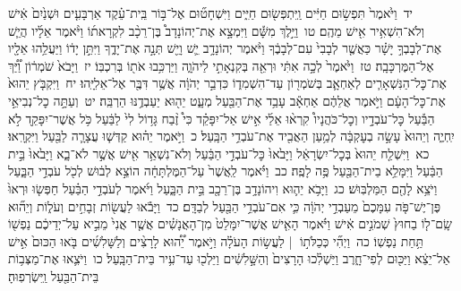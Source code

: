 \documentclass[18pt]{article}
\newcommand{\vart}[1]{\Bfootnote{#1}}	%
\begin{document}
 {\loc יד~}וַיֹּ֙אמֶר֙ תִּפְשׂ֣וּם חַיִּ֔ים וַֽיִּתְפְּשׂ֖וּם חַיִּ֑ים וַיִּשְׁחָט֞וּם אֶל־בּ֣וֹר בֵּֽית־עֵ֗קֶד אַרְבָּעִ֤ים וּשְׁנַ֙יִם֙ אִ֔ישׁ וְלֹא־הִשְׁאִ֥יר אִ֖ישׁ מֵהֶֽם׃ \startlock
 {\loc טו~}וַיֵּ֣לֶךְ מִשָּׁ֡ם וַיִּמְצָ֣א אֶת־יְהוֹנָדָב֩ בֶּן־רֵכָ֨ב לִקְרָאת֜וֹ  \edtext{וַֽיְבָרְכֵ֗הוּ}{\vart{א=וַֽיְבָרֲכֵ֗הוּ (חטף) | }}  וַיֹּ֨אמֶר אֵלָ֜יו הֲיֵ֧שׁ אֶת־לְבָבְךָ֣ יָשָׁ֗ר כַּאֲשֶׁ֤ר לְבָבִי֙ עִם־לְבָבֶ֔ךָ וַיֹּ֨אמֶר יְהוֹנָדָ֥ב יֵ֛שׁ וָיֵ֖שׁ תְּנָ֣ה אֶת־יָדֶ֑ךָ וַיִּתֵּ֣ן יָד֔וֹ וַיַּעֲלֵ֥הוּ אֵלָ֖יו אֶל־הַמֶּרְכָּבָֽה׃ \startlock
 {\loc טז~}וַיֹּ֙אמֶר֙ לְכָ֣ה אִתִּ֔י וּרְאֵ֖ה בְּקִנְאָתִ֣י לַיהֹוָ֑ה וַיַּרְכִּ֥בוּ אֹת֖וֹ בְּרִכְבּֽוֹ׃ \startlock
 {\loc יז~}וַיָּבֹא֙ שֹׁמְר֔וֹן וַ֠יַּ֠ךְ אֶת־כׇּל־הַנִּשְׁאָרִ֧ים לְאַחְאָ֛ב בְּשֹׁמְר֖וֹן עַד־הִשְׁמִד֑וֹ כִּדְבַ֣ר יְהֹוָ֔ה אֲשֶׁ֥ר דִּבֶּ֖ר אֶל־אֵלִיָּֽהוּ׃ \startlock
 {\loc יח~}וַיִּקְבֹּ֤ץ יֵהוּא֙ אֶת־כׇּל־הָעָ֔ם וַיֹּ֣אמֶר אֲלֵהֶ֔ם אַחְאָ֕ב עָבַ֥ד אֶת־הַבַּ֖עַל מְעָ֑ט יֵה֖וּא יַעַבְדֶ֥נּוּ הַרְבֵּֽה׃ \startlock
 {\loc יט~}וְעַתָּ֣ה כׇל־נְבִיאֵ֣י הַבַּ֡עַל כׇּל־עֹבְדָ֣יו וְכׇל־כֹּהֲנָיו֩ קִרְא֨וּ אֵלַ֜י אִ֣ישׁ אַל־יִפָּקֵ֗ד כִּי֩ זֶ֨בַח גָּד֥וֹל לִי֙ לַבַּ֔עַל כֹּ֥ל אֲשֶׁר־יִפָּקֵ֖ד לֹ֣א יִֽחְיֶ֑ה וְיֵהוּא֙ עָשָׂ֣ה בְעׇקְבָּ֔ה לְמַ֥עַן הַאֲבִ֖יד אֶת־עֹבְדֵ֥י הַבָּֽעַל׃ \startlock
 {\loc כ~}וַיֹּ֣אמֶר יֵה֗וּא קַדְּשׁ֧וּ עֲצָרָ֛ה לַבַּ֖עַל וַיִּקְרָֽאוּ׃ \startlock
 {\loc כא~}וַיִּשְׁלַ֤ח יֵהוּא֙ בְּכׇל־יִשְׂרָאֵ֔ל וַיָּבֹ֙אוּ֙ כׇּל־עֹבְדֵ֣י הַבַּ֔עַל וְלֹא־נִשְׁאַ֥ר אִ֖ישׁ אֲשֶׁ֣ר לֹא־בָ֑א וַיָּבֹ֙אוּ֙ בֵּ֣ית הַבַּ֔עַל וַיִּמָּלֵ֥א בֵית־הַבַּ֖עַל פֶּ֥ה לָפֶֽה׃ \startlock
 {\loc כב~}וַיֹּ֗אמֶר לַֽאֲשֶׁר֙ עַל־הַמֶּלְתָּחָ֔ה הוֹצֵ֣א לְב֔וּשׁ לְכֹ֖ל עֹבְדֵ֣י הַבָּ֑עַל וַיֹּצֵ֥א לָהֶ֖ם הַמַּלְבּֽוּשׁ׃ \startlock
 {\loc כג~}וַיָּבֹ֥א יֵה֛וּא וִיהוֹנָדָ֥ב בֶּן־רֵכָ֖ב בֵּ֣ית הַבָּ֑עַל וַיֹּ֜אמֶר לְעֹבְדֵ֣י הַבַּ֗עַל חַפְּשׂ֤וּ וּרְאוּ֙ פֶּן־יֶשׁ־פֹּ֤ה עִמָּכֶם֙ מֵעַבְדֵ֣י יְהֹוָ֔ה כִּ֛י אִם־עֹבְדֵ֥י הַבַּ֖עַל לְבַדָּֽם׃ \startlock
 {\loc כד~}וַיָּבֹ֕אוּ לַעֲשׂ֖וֹת זְבָחִ֣ים וְעֹל֑וֹת וְיֵה֞וּא שָֽׂם־ל֤וֹ בַחוּץ֙ שְׁמֹנִ֣ים אִ֔ישׁ וַיֹּ֗אמֶר הָאִ֤ישׁ אֲשֶׁר־יִמָּלֵט֙ מִן־הָאֲנָשִׁ֗ים אֲשֶׁ֤ר אֲנִי֙ מֵבִ֣יא עַל־יְדֵיכֶ֔ם נַפְשׁ֖וֹ תַּ֥חַת נַפְשֽׁוֹ׃ \startlock
 {\loc כה~}וַיְהִ֞י כְּכַלֹּת֣וֹ  |  לַעֲשׂ֣וֹת הָעֹלָ֗ה וַיֹּ֣אמֶר יֵ֠ה֠וּא לָרָצִ֨ים וְלַשָּׁלִשִׁ֜ים בֹּ֤אוּ הַכּוּם֙ אִ֣ישׁ אַל־יֵצֵ֔א וַיַּכּ֖וּם לְפִי־חָ֑רֶב וַיַּשְׁלִ֗כוּ הָרָצִים֙ וְהַשָּׁ֣לִשִׁ֔ים וַיֵּלְכ֖וּ עַד־עִ֥יר בֵּית־הַבָּֽעַל׃ \startlock
 {\loc כו~}וַיֹּצִ֛אוּ אֶת־מַצְּב֥וֹת בֵּית־הַבַּ֖עַל וַֽיִּשְׂרְפֽוּהָ׃ \startlock
\end{document}
